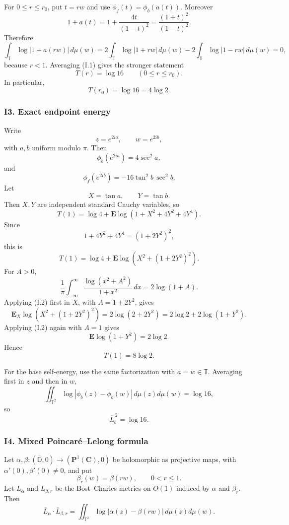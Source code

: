 \documentclass[
  10pt,
  letterpaper,
]{article}
\theoremstyle{definition}
\theoremstyle{remark}
\begin{document}
For \(0\le r\le r_0\), put \(t=rw\) and use \(\phi_f(t)=\phi_b(a(t))\).
Moreover \[
1+a(t)
=1+\frac{4t}{(1-t)^2}
=\frac{(1+t)^2}{(1-t)^2}.
\] Therefore \[
\int_{\mathbb T}\log|1+a(rw)|\,d\mu(w)
=2\int_{\mathbb T}\log|1+rw|\,d\mu(w)
-2\int_{\mathbb T}\log|1-rw|\,d\mu(w)
=0,
\] because \(r<1\). Averaging (I.1) gives the stronger statement \[
\boxed{T(r)=\log16\qquad(0\le r\le r_0).}
\] In particular, \[
\boxed{T(r_0)=\log16=4\log2.}
\]

\subsubsection{I3. Exact endpoint
energy}\label{i3.-exact-endpoint-energy}

Write \[
z=e^{2ia},\qquad w=e^{2ib},
\] with \(a,b\) uniform modulo \(\pi\). Then \[
\phi_b(e^{2ia})=4\sec^2a,
\] and \[
\phi_f(e^{2ib})=-16\tan^2b\,\sec^2b.
\] Let \[
X=\tan a,\qquad Y=\tan b.
\] Then \(X,Y\) are independent standard Cauchy variables, so \[
T(1)
=\log4+
\mathbf E\log\!\left(1+X^2+4Y^2+4Y^4\right).
\] Since \[
1+4Y^2+4Y^4=(1+2Y^2)^2,
\] this is \[
T(1)
=\log4+
\mathbf E\log\!\left(X^2+(1+2Y^2)^2\right).
\] For \(A>0\), \[
\frac1\pi\int_{-\infty}^{\infty}
\frac{\log(x^2+A^2)}{1+x^2}\,dx
=2\log(1+A).
\tag{I.2}
\] Applying (I.2) first in \(X\), with \(A=1+2Y^2\), gives \[
\mathbf E_X\log\!\left(X^2+(1+2Y^2)^2\right)
=2\log(2+2Y^2)
=2\log2+2\log(1+Y^2).
\] Applying (I.2) again with \(A=1\) gives \[
\mathbf E\log(1+Y^2)=2\log2.
\] Hence \[
\boxed{T(1)=8\log2.}
\]

For the base self-energy, use the same factorization with
\(a=w\in\mathbb T\). Averaging first in \(z\) and then in \(w\), \[
\iint_{\mathbb T^2}
\log|\phi_b(z)-\phi_b(w)|\,d\mu(z)d\mu(w)
=\log16,
\] so \[
\boxed{\overline L_b^{\,2}=\log16.}
\]

\subsubsection{I4. Mixed Poincaré--Lelong
formula}\label{i4.-mixed-poincaruxe9lelong-formula}

Let
\(\alpha,\beta:(\overline{\mathbb D},0)\to(\mathbf P^1(\mathbf C),0)\)
be holomorphic as projective maps, with \(\alpha'(0),\beta'(0)\ne0\),
and put \[
\beta_r(w)=\beta(rw),\qquad 0<r\le1.
\] Let \(\overline L_\alpha\) and \(\overline L_{\beta,r}\) be the
Bost--Charles metrics on \(O(1)\) induced by \(\alpha\) and \(\beta_r\).
Then \[
\boxed{
\overline L_\alpha\cdot\overline L_{\beta,r}
=
\iint_{\mathbb T^2}
\log|\alpha(z)-\beta(rw)|\,d\mu(z)d\mu(w).
}
\tag{I.3}
\]
\end{document}
